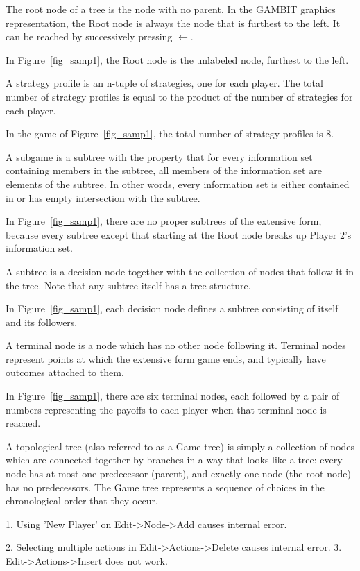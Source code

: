 \documentclass[12pt]{report}
\begin{document}
\begin{helpglossary}
\label{rootnodegloss}
The root node of a tree is the node with no parent. In the GAMBIT graphics
representation, the Root node is always the node that is furthest to the
left.  It can be reached by successively pressing {\bf $\leftarrow$}. 

In Figure~\ref{fig_samp1}, the Root node is the unlabeled node, furthest to 
the left.

\label{stratprofgloss}
A strategy profile is an n-tuple of strategies, one for each player. The 
total number of strategy profiles is equal to the product of the number of 
strategies for each player. 
 
In the game of  Figure~\ref{fig_samp1}, the total number of strategy profiles
 is 8. 

\label{subgamegloss}
A subgame is a subtree with the property that for every information 
set containing members in the subtree, all members of the information 
set are elements of the subtree.  In other words, every information set 
is either contained in or has empty intersection with the subtree. 

In Figure~\ref{fig_samp1}, there are no proper subtrees of the extensive
form, because every subtree except that starting at the Root node breaks
up Player 2's information set.

\label{subtreegloss}
A subtree is a decision node together with the collection of nodes that
follow it in the tree.  Note that any subtree itself has a tree structure.

In Figure~\ref{fig_samp1}, each decision node defines a subtree consisting of itself
and its followers.   

\label{termnodegloss}
A terminal node is a node which has no other node following it.  Terminal 
nodes represent points at which the extensive form game ends, and typically 
have outcomes attached to them. 

In Figure~\ref{fig_samp1}, there are six terminal nodes, each followed by
a pair of numbers representing the payoffs to each player when that
terminal node is reached.

\label{toptreegloss}
A topological tree (also referred to as a Game tree) is simply a
collection of nodes which are connected together by branches in a way that
looks like a tree:  every node has at most one predecessor (parent), and exactly 
one node (the root node) has no predecessors.  
The Game tree represents a sequence of choices in the
chronological order that they occur. 

\end{helpglossary}

1.  Using 'New Player' on Edit->Node->Add causes internal error. 

2.  Selecting multiple actions in Edit->Actions->Delete causes internal error.  
3.  Edit->Actions->Insert does not work.  
\end{document}

